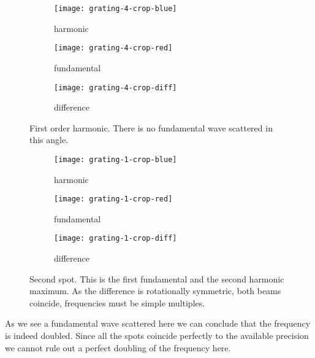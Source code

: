 \documentclass[11pt, english, fleqn, DIV=15, headinclude, BCOR=2cm]{scrreprt}
\begin{document}
\begin{figure}
    \centering
    \begin{subfigure}[c]{0.3\linewidth}
        \centering
        \texttt{[image: grating-4-crop-blue]}
        \caption{%
            harmonic
            }
    \end{subfigure}
    \hfill
    \begin{subfigure}[c]{0.3\linewidth}
        \centering
        \texttt{[image: grating-4-crop-red]}
        \caption{%
            fundamental
            }
    \end{subfigure}
    \hfill
    \begin{subfigure}[c]{0.3\linewidth}
        \centering
        \texttt{[image: grating-4-crop-diff]}
        \caption{%
            difference
            }
    \end{subfigure}
    \caption{%
        First order harmonic. There is no fundamental wave scattered in this
        angle.
        }
    \label{fig:grating-4}
\end{figure}

\begin{figure}
    \centering
    \begin{subfigure}[c]{0.3\linewidth}
        \centering
        \texttt{[image: grating-1-crop-blue]}
        \caption{%
            harmonic
            }
    \end{subfigure}
    \hfill
    \begin{subfigure}[c]{0.3\linewidth}
        \centering
        \texttt{[image: grating-1-crop-red]}
        \caption{%
            fundamental
            }
    \end{subfigure}
    \hfill
    \begin{subfigure}[c]{0.3\linewidth}
        \centering
        \texttt{[image: grating-1-crop-diff]}
        \caption{%
            difference
            }
    \end{subfigure}
    \caption{%
        Second spot. This is the first fundamental and the second harmonic
        maximum. As the difference is rotationally symmetric, both beams
        coincide, frequencies must be simple multiples.
        }
    \label{fig:grating-1}
\end{figure}

As we see a fundamental wave scattered here we can conclude that the frequency
is indeed doubled. Since all the spots coincide perfectly to the available
precision we cannot rule out a perfect doubling of the frequency here.
\end{document}
